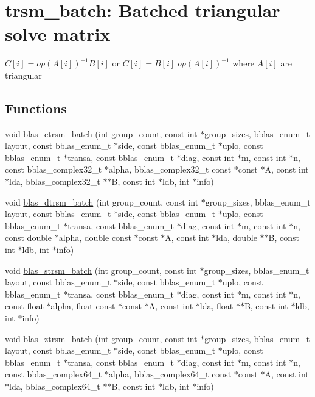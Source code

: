 \hypertarget{group__trsm__batch}{}\section{trsm\+\_\+batch\+: Batched triangular solve matrix}
\label{group__trsm__batch}


$ C[i] = op(A[i])^{-1} B[i] $ or $ C[i] = B[i] \;op(A[i])^{-1} $ where $ A[i] $ are triangular  


\subsection*{Functions}
\begin{DoxyCompactItemize}
\item 
void \hyperlink{group__trsm__batch_ga99df0f7380cf330eebe672bf5c73beab}{blas\+\_\+ctrsm\+\_\+batch} (int group\+\_\+count, const int $\ast$group\+\_\+sizes, bblas\+\_\+enum\+\_\+t layout, const bblas\+\_\+enum\+\_\+t $\ast$side, const bblas\+\_\+enum\+\_\+t $\ast$uplo, const bblas\+\_\+enum\+\_\+t $\ast$transa, const bblas\+\_\+enum\+\_\+t $\ast$diag, const int $\ast$m, const int $\ast$n, const bblas\+\_\+complex32\+\_\+t $\ast$alpha, bblas\+\_\+complex32\+\_\+t const $\ast$const $\ast$A, const int $\ast$lda, bblas\+\_\+complex32\+\_\+t $\ast$$\ast$B, const int $\ast$ldb, int $\ast$info)
\item 
void \hyperlink{group__trsm__batch_ga373c220861d097741d02dc0e86937c0f}{blas\+\_\+dtrsm\+\_\+batch} (int group\+\_\+count, const int $\ast$group\+\_\+sizes, bblas\+\_\+enum\+\_\+t layout, const bblas\+\_\+enum\+\_\+t $\ast$side, const bblas\+\_\+enum\+\_\+t $\ast$uplo, const bblas\+\_\+enum\+\_\+t $\ast$transa, const bblas\+\_\+enum\+\_\+t $\ast$diag, const int $\ast$m, const int $\ast$n, const double $\ast$alpha, double const $\ast$const $\ast$A, const int $\ast$lda, double $\ast$$\ast$B, const int $\ast$ldb, int $\ast$info)
\item 
void \hyperlink{group__trsm__batch_ga9a65f883d9cfdf4ab1baf50342b2b39c}{blas\+\_\+strsm\+\_\+batch} (int group\+\_\+count, const int $\ast$group\+\_\+sizes, bblas\+\_\+enum\+\_\+t layout, const bblas\+\_\+enum\+\_\+t $\ast$side, const bblas\+\_\+enum\+\_\+t $\ast$uplo, const bblas\+\_\+enum\+\_\+t $\ast$transa, const bblas\+\_\+enum\+\_\+t $\ast$diag, const int $\ast$m, const int $\ast$n, const float $\ast$alpha, float const $\ast$const $\ast$A, const int $\ast$lda, float $\ast$$\ast$B, const int $\ast$ldb, int $\ast$info)
\item 
void \hyperlink{group__trsm__batch_gaf4c9a686763abe3d78be2b2746515a2c}{blas\+\_\+ztrsm\+\_\+batch} (int group\+\_\+count, const int $\ast$group\+\_\+sizes, bblas\+\_\+enum\+\_\+t layout, const bblas\+\_\+enum\+\_\+t $\ast$side, const bblas\+\_\+enum\+\_\+t $\ast$uplo, const bblas\+\_\+enum\+\_\+t $\ast$transa, const bblas\+\_\+enum\+\_\+t $\ast$diag, const int $\ast$m, const int $\ast$n, const bblas\+\_\+complex64\+\_\+t $\ast$alpha, bblas\+\_\+complex64\+\_\+t const $\ast$const $\ast$A, const int $\ast$lda, bblas\+\_\+complex64\+\_\+t $\ast$$\ast$B, const int $\ast$ldb, int $\ast$info)
\end{DoxyCompactItemize}


